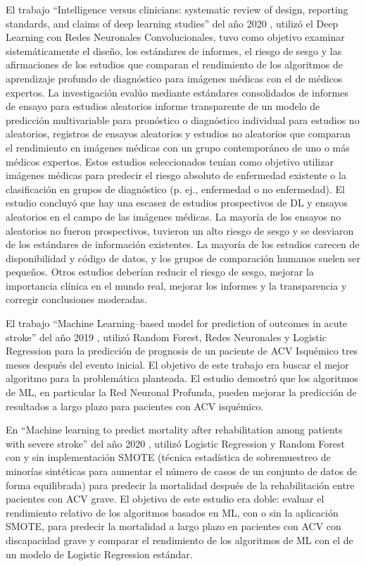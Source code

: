 \par El trabajo “Intelligence versus clinicians: systematic review of design, reporting standards, and claims of deep learning studies” del año 2020 \cite{Nagendran2020}, utilizó el Deep Learning con Redes Neuronales Convolucionales, tuvo como objetivo examinar sistemáticamente el diseño, los estándares de informes, el riesgo de sesgo y las afirmaciones de los estudios que comparan el rendimiento de los algoritmos de aprendizaje profundo de diagnóstico para imágenes médicas con el de médicos expertos. La investigación evalúo mediante estándares consolidados de informes de ensayo para estudios aleatorios informe transparente de un modelo de predicción multivariable para pronóstico o diagnóstico individual para estudios no aleatorios, registros de ensayos aleatorios y estudios no aleatorios que comparan el rendimiento en imágenes médicas con un grupo contemporáneo de uno o más médicos expertos. Estos estudios seleccionados tenían como objetivo utilizar imágenes médicas para predecir el riesgo absoluto de enfermedad existente o la clasificación en grupos de diagnóstico (p. ej., enfermedad o no enfermedad). El estudio concluyó que hay una escasez de estudios prospectivos de DL y ensayos aleatorios en el campo de las imágenes médicas. La mayoría de los ensayos no aleatorios no fueron prospectivos, tuvieron un alto riesgo de sesgo y se desviaron de los estándares de información existentes. La mayoría de los estudios carecen de disponibilidad y código de datos, y los grupos de comparación humanos suelen ser pequeños. Otros estudios deberían reducir el riesgo de sesgo, mejorar la importancia clínica en el mundo real, mejorar los informes y la transparencia y corregir conclusiones moderadas.\\
\par El trabajo “Machine Learning–based model for prediction of outcomes in acute stroke” del año 2019 \cite{Heo2019}, utilizó Random Forest, Redes Neuronales y Logistic Regression para la predicción de prognosis de un paciente de ACV Isquémico tres meses después del evento inicial. El objetivo de este trabajo era buscar el mejor algoritmo para la problemática planteada.
El estudio demostró que los algoritmos de ML, en particular la Red Neuronal Profunda, pueden mejorar la predicción de resultados a largo plazo para pacientes con ACV isquémico.\\
\par En “Machine learning to predict mortality after rehabilitation among patients with severe stroke” del año 2020 \cite{Scrutinio2020}, utilizó Logistic Regression y Random Forest con y sin implementación SMOTE (técnica estadística de sobremuestreo de minorías sintéticas para aumentar el número de casos de un conjunto de datos de forma equilibrada) para predecir la mortalidad después de la rehabilitación entre pacientes con ACV grave. El objetivo de este estudio era doble: evaluar el rendimiento relativo de los algoritmos basados en ML, con o sin la aplicación SMOTE, para predecir la mortalidad a largo plazo en pacientes con ACV con discapacidad grave y comparar el rendimiento de los algoritmos de ML con el de un modelo de Logistic Regression estándar.

